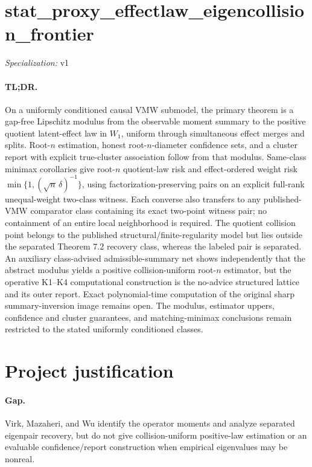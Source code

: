 \documentclass{article}
\begin{document}
\sloppy

\section*{stat\_\allowbreak{}proxy\_\allowbreak{}effectlaw\_\allowbreak{}eigencollision\_\allowbreak{}frontier}

\noindent\textit{Specialization:} v1\par

\paragraph{TL;DR.} On a uniformly conditioned causal VMW submodel, the primary theorem is a gap-free Lipschitz modulus from the observable moment summary to the positive quotient latent-effect law in \(W_1\), uniform through simultaneous effect merges and splits. Root-\(n\) estimation, honest root-\(n\)-diameter confidence sets, and a cluster report with explicit true-cluster association follow from that modulus. Same-class minimax corollaries give root-\(n\) quotient-law risk and effect-ordered weight risk \(\min\{1,(\sqrt n\,\delta)^{-1}\}\), using factorization-preserving pairs on an explicit full-rank unequal-weight two-class witness. Each converse also transfers to any published-VMW comparator class containing its exact two-point witness pair; no containment of an entire local neighborhood is required. The quotient collision point belongs to the published structural/finite-regularity model but lies outside the separated Theorem 7.2 recovery class, whereas the labeled pair is separated. An auxiliary class-advised admissible-summary net shows independently that the abstract modulus yields a positive collision-uniform root-\(n\) estimator, but the operative K1--K4 computational construction is the no-advice structured lattice and its outer report. Exact polynomial-time computation of the original sharp summary-inversion image remains open. The modulus, estimator uppers, confidence and cluster guarantees, and matching-minimax conclusions remain restricted to the stated uniformly conditioned classes.

\section{Project justification}

\paragraph{Gap.} Virk, Mazaheri, and Wu identify the operator moments and analyze separated eigenpair recovery, but do not give collision-uniform positive-law estimation or an evaluable confidence/report construction when empirical eigenvalues may be nonreal.
\end{document}
